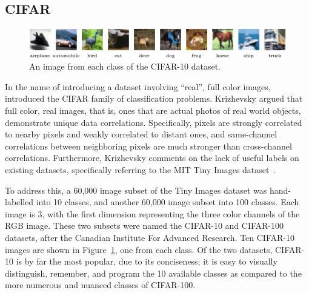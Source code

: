 \subsection{CIFAR}
\begin{figure}[htbp!]
\centering
\includegraphics[width=1\textwidth]{data/cifar10_sample}
\caption[Sample CIFAR-10 images]{An image from each class of the CIFAR-10 dataset.}
\label{fig:cifar10}
\end{figure}

In the name of introducing a dataset involving ``real'', full color images,~\cite{kriv2009} introduced the CIFAR family
of classification problems. Krizhevsky argued that full color, real images, that is, ones that are actual
photos of real world objects, demonstrate unique data correlations. Specifically, pixels are strongly correlated to nearby
pixels and weakly correlated to distant ones, and same-channel correlations between neighboring pixels are much
stronger than cross-channel correlations. Furthermore, Krizhevsky comments on the lack of useful labels on existing datasets,
specifically referring to the MIT Tiny Images dataset~\citep{torralba2008}.

To address this, a 60,000 image subset of the Tiny Images dataset was hand-labelled into 10 classes, and another 60,000
image subset into 100 classes. Each image is 3, with the first dimension representing the three color channels of
the RGB image. These two subsets were named the CIFAR-10 and CIFAR-100 datasets, after the Canadian Institute For Advanced
Research. Ten CIFAR-10 images are shown in Figure~\ref{fig:cifar10}, one from each class. Of the two datasets,
CIFAR-10 is by far the most popular, due to its conciseness; it is easy to visually distinguish, remember,
and program the 10 available classes as compared to the more numerous and nuanced classes of CIFAR-100.

